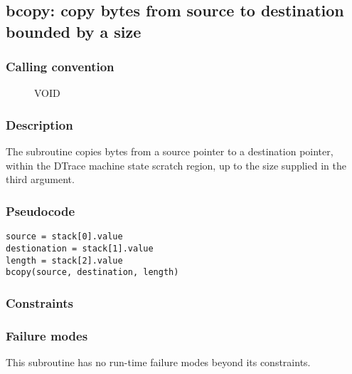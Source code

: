 \clearpage
{}
{}
\label{subr:bcopy}
\subsection*{bcopy: copy bytes from source to destination bounded by a
size}

\subsubsection*{Calling convention}

\begin{description}
\item[] VOID
\end{description}

\subsubsection*{Description}

The  subroutine copies bytes from a source pointer
to a destination pointer, within the DTrace machine state scratch
region, up to the size supplied in the third argument.
\subsubsection*{Pseudocode}

\begin{verbatim}
source = stack[0].value
destionation = stack[1].value
length = stack[2].value
bcopy(source, destination, length)
\end{verbatim}

\subsubsection*{Constraints}

\subsubsection*{Failure modes}

This subroutine has no run-time failure modes beyond its constraints.
